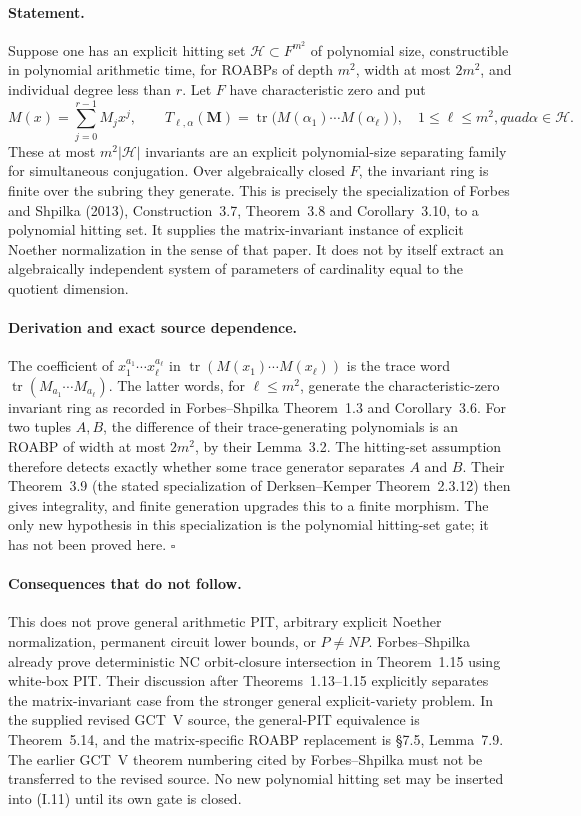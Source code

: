 \documentclass[11pt,a4paper]{article}
\theoremstyle{definition}\newtheorem{definition}{Definition}
\begin{document}
\paragraph{Statement.}
Suppose one has an explicit hitting set $\mathcal H\subset F^{m^2}$
of polynomial size, constructible in polynomial arithmetic time,
for ROABPs of depth $m^2$, width at most $2m^2$, and individual
degree less than $r$.  Let $F$ have characteristic zero and put
\[
 M(x)=\sum_{j=0}^{r-1}M_jx^j,\qquad
 T_{\ell,\alpha}(\mathbf M)=
 \operatorname{tr}\bigl(M(\alpha_1)\cdots M(\alpha_\ell)\bigr),
 \quad1\le\ell\le m^2,quad\alpha\in\mathcal H.
\tag{I.11}
\]
These at most $m^2|\mathcal H|$ invariants are an explicit
polynomial-size separating family for simultaneous conjugation.
Over algebraically closed $F$, the invariant ring is finite over
the subring they generate.  This is precisely the specialization
of Forbes and Shpilka (2013), Construction~3.7, Theorem~3.8 and
Corollary~3.10, to a polynomial hitting set.  It supplies the
matrix-invariant instance of explicit Noether normalization in
the sense of that paper.  It does not by itself extract an
algebraically independent system of parameters of cardinality
equal to the quotient dimension.

\paragraph{Derivation and exact source dependence.}
The coefficient of $x_1^{a_1}\cdots x_\ell^{a_\ell}$ in
$\operatorname{tr}(M(x_1)\cdots M(x_\ell))$ is the trace word
$\operatorname{tr}(M_{a_1}\cdots M_{a_\ell})$.  The latter words,
for $\ell\le m^2$, generate the characteristic-zero invariant ring
as recorded in Forbes--Shpilka Theorem~1.3 and Corollary~3.6.
For two tuples $A,B$, the difference of their trace-generating
polynomials is an ROABP of width at most $2m^2$, by their Lemma~3.2.
The hitting-set assumption therefore detects exactly whether
some trace generator separates $A$ and $B$.  Their Theorem~3.9
(the stated specialization of Derksen--Kemper Theorem~2.3.12)
then gives integrality, and finite generation upgrades this to
a finite morphism.  The only new hypothesis in this specialization
is the polynomial hitting-set gate; it has not been proved here.
\hfill$\square$

\paragraph{Consequences that do not follow.}
This does not prove general arithmetic PIT, arbitrary explicit
Noether normalization, permanent circuit lower bounds, or
$P\ne NP$.  Forbes--Shpilka already prove deterministic NC
orbit-closure intersection in Theorem~1.15 using white-box PIT.
Their discussion after Theorems~1.13--1.15 explicitly separates
the matrix-invariant case from the stronger general explicit-variety
problem.  In the supplied revised GCT~V source, the general-PIT
equivalence is Theorem~5.14, and the matrix-specific ROABP replacement
is \S7.5, Lemma~7.9.  The earlier GCT~V theorem numbering cited by
Forbes--Shpilka must not be transferred to the revised source.  No new polynomial hitting set
may be inserted into (I.11) until its own gate is closed.
\end{document}
